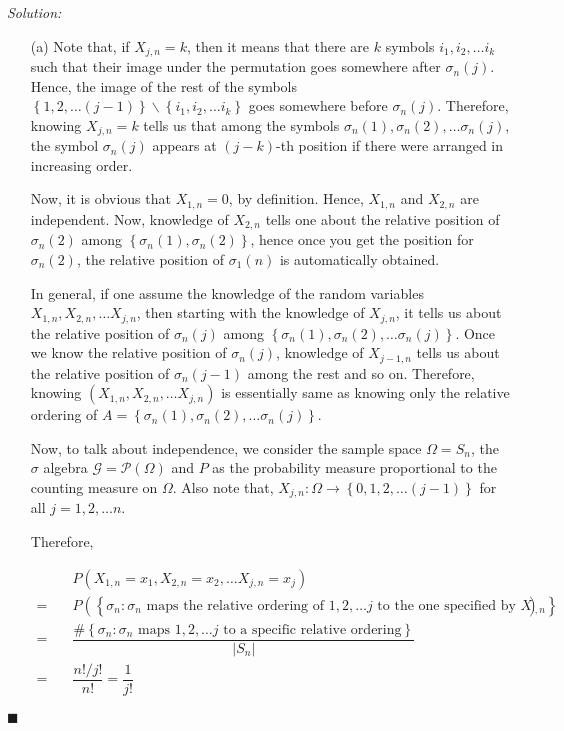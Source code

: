 \documentclass[12pt]{article}
\theoremstyle{definition}
\newenvironment{answer}{\textit{Solution: }\quad }{ \hfill $\blacksquare$}
\begin{document}
\begin{answer}
	\begin{enumerate}
		\item[(a)] Note that, if $X_{j,n} = k$, then it means that there are $k$ symbols $i_1, i_2, \dots i_k$ such that their image under the permutation goes somewhere after $\sigma_n(j)$. Hence, the image of the rest of the symbols $\left\{ 1, 2, \dots (j-1) \right\} \backslash \left\{ i_1, i_2, \dots i_k \right\}$ goes somewhere before $\sigma_n(j)$. Therefore, knowing $X_{j,n} = k$ tells us that among the symbols $\sigma_n(1), \sigma_n(2), \dots \sigma_n(j)$, the symbol $\sigma_n(j)$ appears at $(j-k)$-th position if there were arranged in increasing order.
		
		Now, it is obvious that $X_{1, n} = 0$, by definition. Hence, $X_{1, n}$ and $X_{2, n}$ are independent. Now, knowledge of $X_{2,n}$ tells one about the relative position of $\sigma_n(2)$ among $\left\{\sigma_n(1), \sigma_n(2) \right\}$, hence once you get the position for $\sigma_n(2)$, the relative position of $\sigma_1(n)$ is automatically obtained.
		
		In general, if one assume the knowledge of the random variables $X_{1, n}, X_{2, n}, \dots X_{j, n}$, then starting with the knowledge of $X_{j, n}$, it tells us about the relative position of $\sigma_n(j)$ among $\left\{ \sigma_n(1), \sigma_n(2), \dots \sigma_n(j) \right\}$. Once we know the relative position of $\sigma_n(j)$, knowledge of $X_{j-1, n}$ tells us about the relative position of $\sigma_n(j-1)$ among the rest and so on. Therefore, knowing $(X_{1, n}, X_{2, n}, \dots X_{j, n})$ is essentially same as knowing only the relative ordering of $A = \left\{ \sigma_n(1), \sigma_n(2), \dots \sigma_n(j) \right\}$.

		Now, to talk about independence, we consider the sample space $\Omega = S_n$, the $\sigma$ algebra $\mathcal{G} = \mathcal{P}(\Omega)$ and $P$ as the probability measure proportional to the counting measure on $\Omega$. Also note that, $X_{j, n} : \Omega \rightarrow \left\{ 0, 1, 2, \dots (j-1) \right\}$ for all $j = 1, 2, \dots n$.

		Therefore,

		\begin{align*}
			& P(X_{1, n} = x_1, X_{2, n} = x_2, \dots X_{j, n} = x_j)\\
			= \quad & P\left( \left\{ \sigma_n : \sigma_n \text{ maps the relative ordering of } 1, 2, \dots j \text{ to the one specified by } X_{\cdot, n}\right\} \right)\\
			= \quad & \dfrac{\# \left\{ \sigma_n : \sigma_n \text{ maps } 1, 2, \dots j \text{ to a specific relative ordering} \right\} }{\vert S_n \vert}\\
			= \quad & \dfrac{n! / j!}{n!} = \dfrac{1}{j!}
		\end{align*}


\end{enumerate}
\end{answer}
\end{document}
